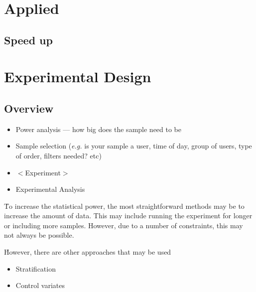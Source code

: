 
\chapter{Applied}

\section{Speed up}


\chapter{Experimental Design}

\section{Overview}



\begin{itemize}[noitemsep,topsep=0pt]
	\item Power analysis --- how big does the sample need to be \ALR
	\item Sample selection (\textit{e.g.} is your sample a user, time of day, group of users, type of order, filters needed? etc) \ALR
	\item $<$Experiment$>$
	\item Experimental Analysis \ALR
\end{itemize}


\r{To increase the statistical power, the most straightforward methods may be to increase the amount of data. This may include running the experiment for longer or including more samples. However, due to a number of constraints, this may not always be possible.}

\r{However, there are other approaches that may be used}

\begin{itemize}[noitemsep,topsep=0pt]
	\item Stratification \ALR
	\item Control variates \ALR
\end{itemize}


